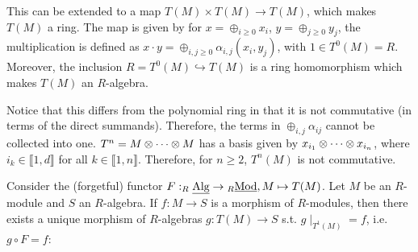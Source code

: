 \documentclass{article}
\begin{document}
\begin{remark}
    This can be extended to a map $T(M) \times T(M) \to T(M)$, which makes $T(M)$ a ring. The map is given by for $x = \oplus_{i \geq 0} x_i$, $y = \oplus_{j \geq 0} y_j$, the multiplication is defined as $x \cdot y = \oplus_{i, j \geq 0} \alpha_{i, j}(x_i, y_j)$, with $1 \in T^0(M) = R$. Moreover, the inclusion $R = T^0(M) \hookrightarrow T(M)$ is a ring homomorphism which makes $T(M)$ an $R$-algebra.
\end{remark}

\begin{remark}
    Notice that this differs from the polynomial ring in that it is not commutative (in terms of the direct summands). Therefore, the terms in $\oplus_{i, j} \alpha_{ij}$ cannot be collected into one. $T^n = M \otimes \cdots \otimes M$ has a basis given by $x_{i_1} \otimes \cdots \otimes x_{i_n}$, where $i_k \in \llbracket 1, d \rrbracket$ for all $k \in \llbracket 1, n \rrbracket$. Therefore, for $n \geq 2$, $T^n(M)$ is not commutative.
\end{remark}

\begin{proposition}
    Consider the (forgetful) functor $F: _{R}\underline{\textup{Alg}} \to {}_{R}\underline{\textup{Mod}}, M \mapsto T(M)$. Let $M$ be an $R$-module and $S$ an $R$-algebra. If $f: M \to S$ is a morphism of $R$-modules, then there exists a unique morphism of $R$-algebras $g: T(M) \to S$ s.t. $g\mid_{T^1(M)} = f$, i.e. $g \circ F = f$:
    \begin{figure}[htbp]
        \centering
    \end{figure}
\end{proposition}
\end{document}
